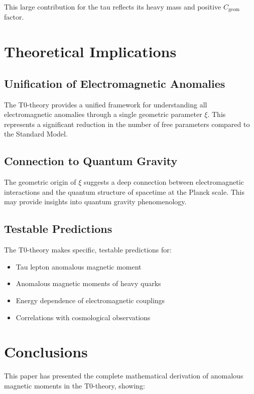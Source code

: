 \documentclass[12pt,a4paper]{article}
\newcommand{\xipar}{\xi}
\newcommand{\Cgeom}{C_{\text{geom}}}
\begin{document}
	This large contribution for the tau reflects its heavy mass and positive $\Cgeom$ factor.
	
	\section{Theoretical Implications}
	
	\subsection{Unification of Electromagnetic Anomalies}
	
	The T0-theory provides a unified framework for understanding all electromagnetic anomalies through a single geometric parameter $\xipar$. This represents a significant reduction in the number of free parameters compared to the Standard Model.
	
	\subsection{Connection to Quantum Gravity}
	
	The geometric origin of $\xipar$ suggests a deep connection between electromagnetic interactions and the quantum structure of spacetime at the Planck scale. This may provide insights into quantum gravity phenomenology.
	
	\subsection{Testable Predictions}
	
	The T0-theory makes specific, testable predictions for:
	
	\begin{itemize}
		\item Tau lepton anomalous magnetic moment
		\item Anomalous magnetic moments of heavy quarks
		\item Energy dependence of electromagnetic couplings
		\item Correlations with cosmological observations
	\end{itemize}
	
	\section{Conclusions}
	
	This paper has presented the complete mathematical derivation of anomalous magnetic moments in the T0-theory, showing:
	
\end{document}
